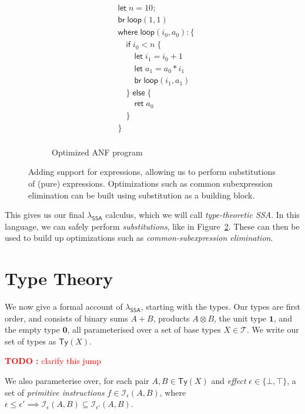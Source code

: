 \documentclass[acmsmall,screen,review]{acmart}
\newcounter{todos}
\newcommand{\TODO}[1]{{
  \stepcounter{todos}
  \begin{center}\large{\textcolor{red}{\textbf{TODO \arabic{todos}:} #1}}\end{center}
}}
\newcommand{\mc}[1]{\ensuremath{\mathcal{#1}}}
\newcommand{\mb}[1]{\ensuremath{\mathbf{#1}}}
\newcommand{\ms}[1]{\ensuremath{\mathsf{#1}}}
\newcommand{\isotopessa}{\(\lambda_{\ms{SSA}}\)}
\begin{document}
\begin{figure}
\begin{subfigure}[t]{.31\textwidth}
\begin{align*}
      & \ms{let}\;n = 10; \\
      & \ms{br}\;\ms{loop}(1, 1) \\
      & \ms{where}\;\ms{loop}(i_0, a_0): \{\\
      & \quad \ms{if}\;i_0 < n\;\{ \\
      & \qquad \ms{let}\;i_1 = i_0 + 1 \\
      & \qquad \ms{let}\;a_1 = a_0 * i_1 \\
      & \qquad \ms{br}\;\ms{loop}(i_1, a_1) \\
      & \quad \}\;\ms{else}\;\{ \\
      & \qquad \ms{ret}\;a_0 \\
      & \quad \} \\
      & \} \\
    \end{align*}
    \caption{Optimized ANF program}
    \label{fig:fact-opt}
  \end{subfigure}
  \caption{
    Adding support for expressions, allowing us to perform substitutions of (pure) expressions.
    Optimizations such as common subexpression elimination can be built using substitution as a
    building block.
  }
  \Description{}
  \label{fig:fact-cse}
\end{figure}

This gives us our final \isotopessa{} calculus, which we will call \emph{type-theoretic SSA}. In
this language, we can safely perform \textit{substitutions}, like in Figure~\ref{fig:fact-cse}.
These can then be used to build up optimizations such as \textit{common-subexpression elimination}.
 
\section{Type Theory}

\label{sec:typing}

We now give a formal account of \isotopessa{}, starting with the types. Our types are first order,
and consists of binary sums $A + B$, products $A \otimes B$, the unit type $\mathbf{1}$, and the
empty type $\mb{0}$, all parameterised over a set of base types $X \in \mc{T}$. We write our set of
types as $\ms{Ty}(X)$. 

\TODO{clarify this jump}

We also parameterise over, for each pair $A, B \in \ms{Ty}(X)$ and
\emph{effect} $\epsilon \in \{\bot, \top\}$, a set of \textit{primitive instructions} $f \in
\mc{I}_\epsilon(A, B)$, where $\epsilon \leq \epsilon' \implies \mc{I}_\epsilon(A, B) \subseteq
\mc{I}_{\epsilon'}(A, B)$. 
  
\end{document}
